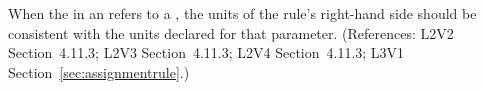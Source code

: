 When the  in an \AssignmentRule refers to a \Parameter, the
units of the rule's right-hand side should be consistent with the units
declared for that parameter.  (References: L2V2 Section~4.11.3;
L2V3 Section~4.11.3; L2V4 Section~4.11.3; L3V1 Section~\ref{sec:assignmentrule}.)
